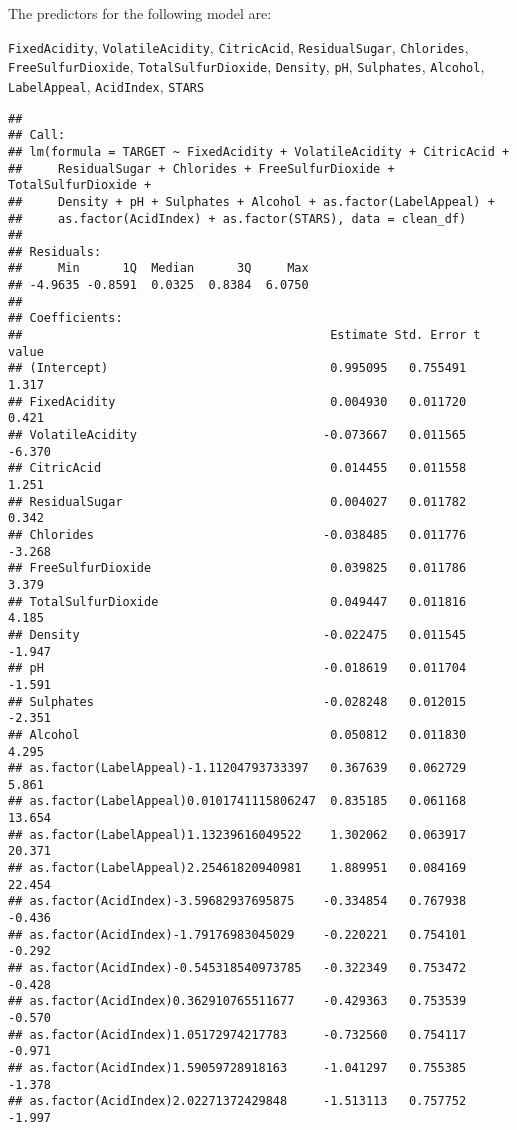 \documentclass[
]{article}
\begin{document}
The predictors for the following model are:

\texttt{FixedAcidity}, \texttt{VolatileAcidity}, \texttt{CitricAcid},
\texttt{ResidualSugar}, \texttt{Chlorides}, \texttt{FreeSulfurDioxide},
\texttt{TotalSulfurDioxide}, \texttt{Density}, \texttt{pH},
\texttt{Sulphates}, \texttt{Alcohol}, \texttt{LabelAppeal},
\texttt{AcidIndex}, \texttt{STARS}

\begin{verbatim}
## 
## Call:
## lm(formula = TARGET ~ FixedAcidity + VolatileAcidity + CitricAcid + 
##     ResidualSugar + Chlorides + FreeSulfurDioxide + TotalSulfurDioxide + 
##     Density + pH + Sulphates + Alcohol + as.factor(LabelAppeal) + 
##     as.factor(AcidIndex) + as.factor(STARS), data = clean_df)
## 
## Residuals:
##     Min      1Q  Median      3Q     Max 
## -4.9635 -0.8591  0.0325  0.8384  6.0750 
## 
## Coefficients:
##                                           Estimate Std. Error t value
## (Intercept)                               0.995095   0.755491   1.317
## FixedAcidity                              0.004930   0.011720   0.421
## VolatileAcidity                          -0.073667   0.011565  -6.370
## CitricAcid                                0.014455   0.011558   1.251
## ResidualSugar                             0.004027   0.011782   0.342
## Chlorides                                -0.038485   0.011776  -3.268
## FreeSulfurDioxide                         0.039825   0.011786   3.379
## TotalSulfurDioxide                        0.049447   0.011816   4.185
## Density                                  -0.022475   0.011545  -1.947
## pH                                       -0.018619   0.011704  -1.591
## Sulphates                                -0.028248   0.012015  -2.351
## Alcohol                                   0.050812   0.011830   4.295
## as.factor(LabelAppeal)-1.11204793733397   0.367639   0.062729   5.861
## as.factor(LabelAppeal)0.0101741115806247  0.835185   0.061168  13.654
## as.factor(LabelAppeal)1.13239616049522    1.302062   0.063917  20.371
## as.factor(LabelAppeal)2.25461820940981    1.889951   0.084169  22.454
## as.factor(AcidIndex)-3.59682937695875    -0.334854   0.767938  -0.436
## as.factor(AcidIndex)-1.79176983045029    -0.220221   0.754101  -0.292
## as.factor(AcidIndex)-0.545318540973785   -0.322349   0.753472  -0.428
## as.factor(AcidIndex)0.362910765511677    -0.429363   0.753539  -0.570
## as.factor(AcidIndex)1.05172974217783     -0.732560   0.754117  -0.971
## as.factor(AcidIndex)1.59059728918163     -1.041297   0.755385  -1.378
## as.factor(AcidIndex)2.02271372429848     -1.513113   0.757752  -1.997

\end{verbatim}
\end{document}
